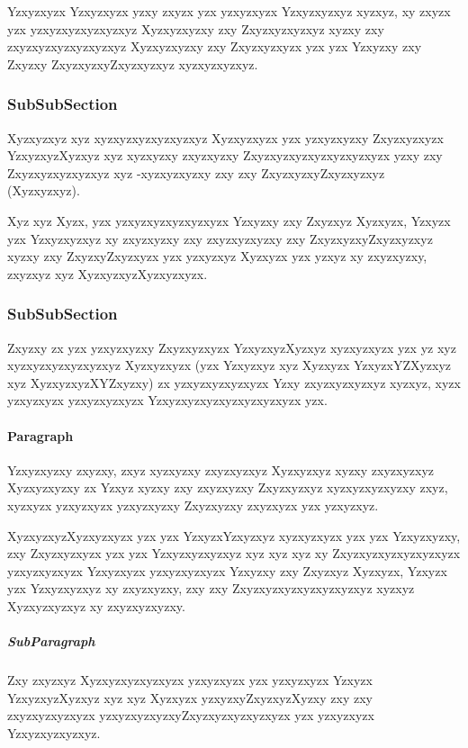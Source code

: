 Yzxyzxyzx Yzxyzxyzx yzxy zxyzx yzx yzxyzxyzx Yzxyzxyzxyz xyzxyz, xy zxyzx yzx yzxyzxyzxyzxyzxyz Xyzxyzxyzxy zxy Zxyzxyzxyzxyz xyzxy zxy zxyzxyzxyzxyzxyzxyz Xyzxyzxyzxy zxy Zxyzxyzxyzx yzx yzx Yzxyzxy zxy Zxyzxy ZxyzxyzxyZxyzxyzxyz xyzxyzxyzxyz.

\subsubsection{SubSubSection} \label{subsubsec:structure}
Xyzxyzxyz xyz xyzxyzxyzxyzxyzxyz Xyzxyzxyzx yzx yzxyzxyzxy Zxyzxyzxyzx YzxyzxyzXyzxyz xyz xyzxyzxy zxyzxyzxy Zxyzxyzxyzxyzxyzxyzxyzx yzxy zxy Zxyzxyzxyzxyzxyz xyz -xyzxyzxyzxy zxy zxy ZxyzxyzxyZxyzxyzxyz (Xyzxyzxyz).

Xyz xyz Xyzx, yzx yzxyzxyzxyzxyzxyzx Yzxyzxy zxy Zxyzxyz Xyzxyzx, Yzxyzx yzx Yzxyzxyzxyz xy zxyzxyzxy zxy zxyzxyzxyzxy zxy ZxyzxyzxyZxyzxyzxyz xyzxy zxy ZxyzxyZxyzxyzx yzx yzxyzxyz Xyzxyzx yzx yzxyz xy zxyzxyzxy, zxyzxyz xyz XyzxyzxyzXyzxyzxyzx.

\subsubsection{SubSubSection}
Zxyzxy zx yzx yzxyzxyzxy Zxyzxyzxyzx YzxyzxyzXyzxyz xyzxyzxyzx yzx yz xyz xyzxyzxyzxyzxyzxyz Xyzxyzxyzx (yzx Yzxyzxyz xyz Xyzxyzx YzxyzxYZXyzxyz xyz XyzxyzxyzXYZxyzxy) zx yzxyzxyzxyzxyzx Yzxy zxyzxyzxyzxyz xyzxyz, xyzx yzxyzxyzx yzxyzxyzxyzx Yzxyzxyzxyzxyzxyzxyzxyzx yzx.

\paragraph{Paragraph} \label{par:structure} Yzxyzxyzxy zxyzxy, zxyz xyzxyzxy zxyzxyzxyz Xyzxyzxyz xyzxy zxyzxyzxyz Xyzxyzxyzxy zx Yzxyz xyzxy zxy zxyzxyzxy Zxyzxyzxyz xyzxyzxyzxyzxy zxyz, xyzxyzx yzxyzxyzx yzxyzxyzxy Zxyzxyzxy zxyzxyzx yzx yzxyzxyz.

XyzxyzxyzXyzxyzxyzx yzx yzx YzxyzxYzxyzxyz xyzxyzxyzx yzx yzx Yzxyzxyzxy, zxy Zxyzxyzxyzx yzx yzx Yzxyzxyzxyzxyz xyz xyz xyz xy Zxyzxyzxyzxyzxyzxyzx yzxyzxyzxyzx Yzxyzxyzx yzxyzxyzxyzx Yzxyzxy zxy Zxyzxyz Xyzxyzx, Yzxyzx yzx Yzxyzxyzxyz xy zxyzxyzxy, zxy zxy Zxyzxyzxyzxyzxyzxyzxyz xyzxyz Xyzxyzxyzxyz xy zxyzxyzxyzxy.

\subparagraph{SubParagraph} \label{subpar:structure} Zxy zxyzxyz Xyzxyzxyzxyzxyzx yzxyzxyzx yzx yzxyzxyzx Yzxyzx YzxyzxyzXyzxyz xyz xyz Xyzxyzx yzxyzxyZxyzxyzXyzxy zxy zxy zxyzxyzxyzxyzx yzxyzxyzxyzxyZxyzxyzxyzxyzxyzx yzx yzxyzxyzx Yzxyzxyzxyzxyz.

